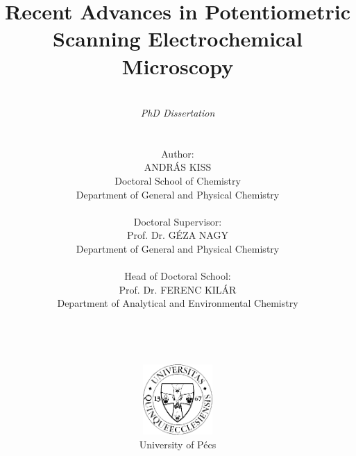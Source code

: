 \pagestyle{empty}

\title{\textbf{Recent Advances in Potentiometric Scanning Electrochemical Microscopy}}

\author{\\ \emph{PhD Dissertation} \\ \\ \\ Author: \\ ANDRÁS KISS \\ Doctoral School of Chemistry \\ Department of General and Physical Chemistry \\ \\ Doctoral Supervisor: \\ Prof. Dr. GÉZA NAGY
\\ Department of General and Physical Chemistry \\
\\ Head of Doctoral School: \\
Prof. Dr. FERENC KILÁR\\
Department of Analytical and Environmental Chemistry \\
\\ \\ \\ \\
\includegraphics[width=0.2\textwidth]{img/pte_logo.eps} \\
University of Pécs}
\maketitle

\thispagestyle{empty}
\large
\setcounter{tocdepth}{4}
\tableofcontents
\newpage
\thispagestyle{empty}
\thispagestyle{empty}
